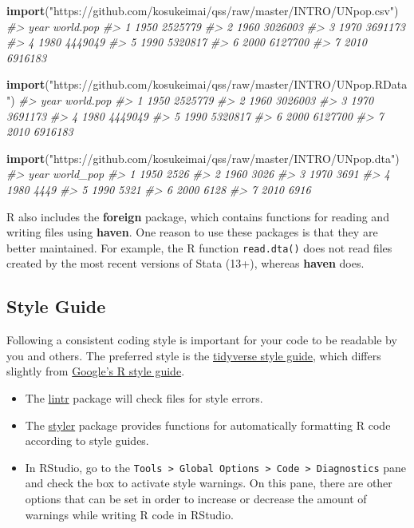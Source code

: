 \documentclass[]{book}
\newenvironment{Shaded}{\begin{snugshade}}{\end{snugshade}}
\newcommand{\CommentTok}[1]{\textcolor[rgb]{0.56,0.35,0.01}{\textit{#1}}}
\newcommand{\KeywordTok}[1]{\textcolor[rgb]{0.13,0.29,0.53}{\textbf{#1}}}
\newcommand{\NormalTok}[1]{#1}
\newcommand{\StringTok}[1]{\textcolor[rgb]{0.31,0.60,0.02}{#1}}
\providecommand{\tightlist}{%
  \setlength{\itemsep}{0pt}\setlength{\parskip}{0pt}}
\theoremstyle{definition}
\theoremstyle{definition}
\theoremstyle{definition}
\theoremstyle{remark}
\begin{document}
\begin{Shaded}
\begin{Highlighting}[]
\KeywordTok{import}\NormalTok{(}\StringTok{"https://github.com/kosukeimai/qss/raw/master/INTRO/UNpop.csv"}\NormalTok{)}
\CommentTok{#>   year world.pop}
\CommentTok{#> 1 1950   2525779}
\CommentTok{#> 2 1960   3026003}
\CommentTok{#> 3 1970   3691173}
\CommentTok{#> 4 1980   4449049}
\CommentTok{#> 5 1990   5320817}
\CommentTok{#> 6 2000   6127700}
\CommentTok{#> 7 2010   6916183}

\KeywordTok{import}\NormalTok{(}\StringTok{"https://github.com/kosukeimai/qss/raw/master/INTRO/UNpop.RData"}\NormalTok{)}
\CommentTok{#>   year world.pop}
\CommentTok{#> 1 1950   2525779}
\CommentTok{#> 2 1960   3026003}
\CommentTok{#> 3 1970   3691173}
\CommentTok{#> 4 1980   4449049}
\CommentTok{#> 5 1990   5320817}
\CommentTok{#> 6 2000   6127700}
\CommentTok{#> 7 2010   6916183}

\KeywordTok{import}\NormalTok{(}\StringTok{"https://github.com/kosukeimai/qss/raw/master/INTRO/UNpop.dta"}\NormalTok{)}
\CommentTok{#>   year world_pop}
\CommentTok{#> 1 1950      2526}
\CommentTok{#> 2 1960      3026}
\CommentTok{#> 3 1970      3691}
\CommentTok{#> 4 1980      4449}
\CommentTok{#> 5 1990      5321}
\CommentTok{#> 6 2000      6128}
\CommentTok{#> 7 2010      6916}
\end{Highlighting}
\end{Shaded}

R also includes the \textbf{foreign} package, which contains functions
for reading and writing files using \textbf{haven}. One reason to use
these packages is that they are better maintained. For example, the R
function \texttt{read.dta()} does not read files created by the most
recent versions of Stata (13+), whereas \textbf{haven} does.

\hypertarget{style-guide}{%
\subsection{Style Guide}\label{style-guide}}

Following a consistent coding style is important for your code to be
readable by you and others. The preferred style is the
\href{http://style.tidyverse.org/}{tidyverse style guide}, which differs
slightly from \href{http://style.tidyverse.org/}{Google's R style
guide}.

\begin{itemize}
\tightlist
\item
  The \href{https://cran.r-project.org/package=lintr}{lintr} package
  will check files for style errors.
\item
  The \href{https://cran.r-project.org/package=styler}{styler} package
  provides functions for automatically formatting R code according to
  style guides.
\item
  In RStudio, go to the
  \texttt{Tools\ \textgreater{}\ Global\ Options\ \textgreater{}\ Code\ \textgreater{}\ Diagnostics}
  pane and check the box to activate style warnings. On this pane, there
  are other options that can be set in order to increase or decrease the
  amount of warnings while writing R code in RStudio.
\end{itemize}
\end{document}
